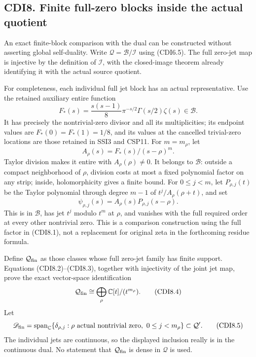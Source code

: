 \subsection{CDI8. Finite full-zero blocks inside the actual
quotient}\label{cdi8.-finite-full-zero-blocks-inside-the-actual-quotient}

An exact finite-block comparison with the dual can be constructed
without asserting global self-duality. Write
\(\mathcal Q=\mathcal B/\mathcal I\) using (CDI6.5). The full zero-jet
map is injective by the definition of \(\mathcal I\), with the
closed-image theorem already identifying it with the actual source
quotient.

For completeness, each individual full jet block has an actual
representative. Use the retained auxiliary entire function \[
F_*(s)=\frac{s(s-1)}8\pi^{-s/2}\Gamma(s/2)\zeta(s)\in\mathcal B.
\tag{CDI8.1}
\] It has precisely the nontrivial-zero divisor and all its
multiplicities; its endpoint values are \(F_*(0)=F_*(1)=1/8\), and its
values at the cancelled trivial-zero locations are those retained in
SSI3 and CSP11. For \(m=m_\rho\), let \[
A_\rho(s)=F_*(s)/(s-\rho)^m.
\tag{CDI8.2}
\] Taylor division makes it entire with \(A_\rho(\rho)\ne0\). It belongs
to \(\mathcal B\): outside a compact neighborhood of \(\rho\), division
costs at most a fixed polynomial factor on any strip; inside,
holomorphicity gives a finite bound. For \(0\le j<m\), let
\(P_{\rho,j}(t)\) be the Taylor polynomial through degree \(m-1\) of
\(t^j/A_\rho(\rho+t)\), and set \[
\psi_{\rho,j}(s)=A_\rho(s)P_{\rho,j}(s-\rho).
\tag{CDI8.3}
\] This is in \(\mathcal B\), has jet \(t^j\) modulo \(t^m\) at
\(\rho\), and vanishes with the full required order at every other
nontrivial zero. This is a comparison construction using the full factor
in (CDI8.1), not a replacement for original zeta in the forthcoming
residue formula.

Define \(\mathcal Q_{\rm fin}\) as those classes whose full zero-jet
family has finite support. Equations (CDI8.2)--(CDI8.3), together with
injectivity of the joint jet map, prove the exact vector-space
identification \[
\mathcal Q_{\rm fin}\cong
\bigoplus_{\rho}\mathbb C[t]/(t^{m_\rho}).
\tag{CDI8.4}
\] Let \[
\mathscr D_{\rm fin}=\operatorname{span}_{\mathbb C}
\{\delta_{\rho,j}:\rho\text{ actual nontrivial zero},\ 0\le j<m_\rho\}
\subset\mathcal Q'.
\tag{CDI8.5}
\] The individual jets are continuous, so the displayed inclusion really
is in the continuous dual. No statement that \(\mathcal Q_{\rm fin}\) is
dense in \(\mathcal Q\) is used.

